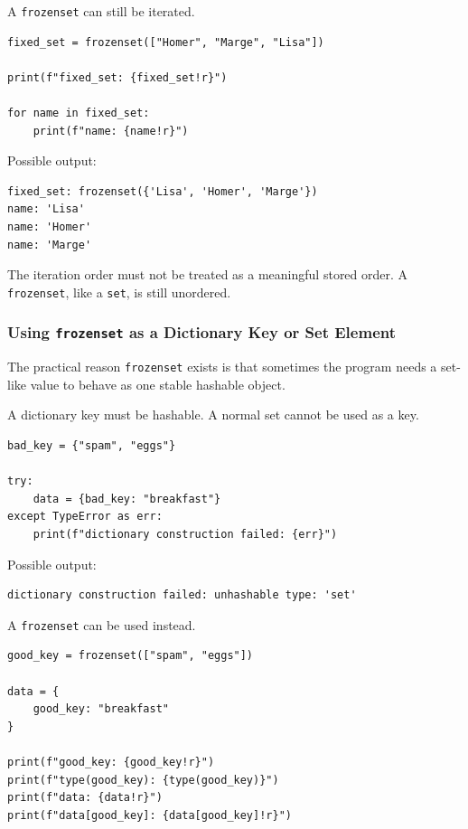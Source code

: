 A \texttt{frozenset} can still be iterated.

\begin{verbatim}
fixed_set = frozenset(["Homer", "Marge", "Lisa"])

print(f"fixed_set: {fixed_set!r}")

for name in fixed_set:
    print(f"name: {name!r}")
\end{verbatim}

Possible output:

\begin{verbatim}
fixed_set: frozenset({'Lisa', 'Homer', 'Marge'})
name: 'Lisa'
name: 'Homer'
name: 'Marge'
\end{verbatim}

The iteration order must not be treated as a meaningful stored order. A \texttt{frozenset}, like a \texttt{set}, is still unordered.

\subsubsection{Using \texttt{frozenset} as a Dictionary Key or Set Element}

The practical reason \texttt{frozenset} exists is that sometimes the program needs a set-like value to behave as one stable hashable object.

A dictionary key must be hashable. A normal set cannot be used as a key.

\begin{verbatim}
bad_key = {"spam", "eggs"}

try:
    data = {bad_key: "breakfast"}
except TypeError as err:
    print(f"dictionary construction failed: {err}")
\end{verbatim}

Possible output:

\begin{verbatim}
dictionary construction failed: unhashable type: 'set'
\end{verbatim}

A \texttt{frozenset} can be used instead.

\begin{verbatim}
good_key = frozenset(["spam", "eggs"])

data = {
    good_key: "breakfast"
}

print(f"good_key: {good_key!r}")
print(f"type(good_key): {type(good_key)}")
print(f"data: {data!r}")
print(f"data[good_key]: {data[good_key]!r}")
\end{verbatim}

